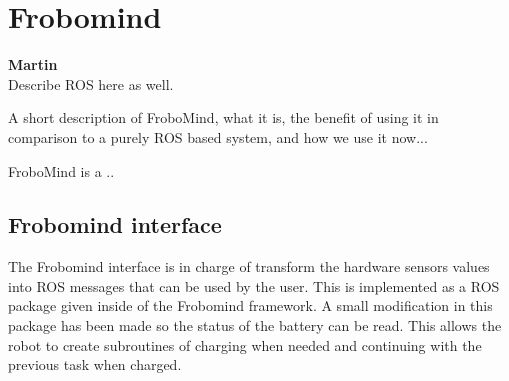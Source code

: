 \section{Frobomind} %
\label{sec:mr_frobomind}

\textbf{Martin}\\

Describe ROS here as well. 

A short description of FroboMind, what it is, the benefit of using it in comparison to a purely ROS based system, and how we use it now...

FroboMind is a ..

	\subsection{Frobomind interface} %
	\label{sub:mr_frobomind_interface}
	The Frobomind interface is in charge of transform the hardware sensors values into ROS messages that can be used by the user.
	This is implemented as a ROS package given inside of the Frobomind framework.
	A small modification in this package has been made so the status of the battery can be read.
	This allows the robot to create subroutines of charging when needed and continuing with the previous task when charged.


